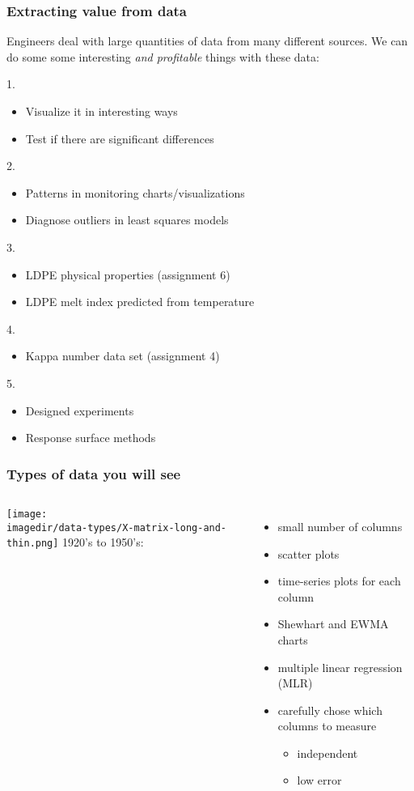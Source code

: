 \begin{frame}\frametitle{Extracting value from data}

	Engineers deal with large quantities of data from many different sources. We can do some some interesting \emph{and profitable} things with these data:

	1. {\color{myOrange}{Improve process understanding }}
	\begin{itemize}
		\item	Visualize it in interesting ways
		\item	Test if there are significant differences
	\end{itemize}
	2. {\color{myOrange}{Troubleshooting process problems}}
	\begin{itemize}
		\item	Patterns in monitoring charts/visualizations
		\item	Diagnose outliers in least squares models
	\end{itemize}
	3. {\color{myOrange}{Predictive modelling }}
	\begin{itemize}
		\item	LDPE physical properties (assignment 6)
		\item	LDPE melt index predicted from temperature
	\end{itemize}
	4. {\color{myOrange}{Process monitoring }}
	\begin{itemize}
		\item	Kappa number data set (assignment 4)
	\end{itemize}
	5. {\color{myOrange}{Process optimization and improvement }}
	\begin{itemize}
		\item	Designed experiments
		\item	Response surface methods
	\end{itemize}
\end{frame}

\begin{frame}\frametitle{Types of data you will see}
	\begin{columns}
		\column{4cm}
		\texttt{[image: \\imagedir/data-types/X-matrix-long-and-thin.png]} \column{6cm} 1920's to 1950's:
		\begin{itemize}
			\item	small number of columns
			\item	scatter plots
			\item	time-series plots for each column
			\item	Shewhart and EWMA charts
			\item	multiple linear regression (MLR)
			\item	carefully chose which columns to measure
			\begin{itemize}
				\item	independent
				\item	low error
			\end{itemize}
		\end{itemize}
	\end{columns}
\end{frame}

